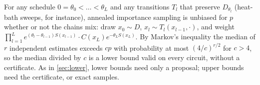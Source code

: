 \begin{remark}
For any schedule $0=\theta_0<\dots<\theta_L$ and any transitions $T_l$ that preserve
$D_{\theta_l}$ (heat-bath sweeps, for instance), annealed importance sampling \cite{neal2001} is
unbiased for $p$ whether or not the chains mix: draw $x_0\sim D$, $x_l\sim T_l(x_{l-1},\cdot)$, and
weight $\prod_{l=1}^Le^{(\theta_l-\theta_{l-1})S(x_{l-1})}\cdot C(x_L)e^{-\theta_LS(x_L)}$. By Markov's
inequality the median of $r$ independent estimates exceeds $cp$ with probability at most
$(4/c)^{r/2}$ for $c>4$, so the median divided by $c$ is a lower bound valid on every circuit,
without a certificate. As in \cref{sec:lower}, lower bounds need only a proposal; upper
bounds need the certificate, or exact samples.
\end{remark}
